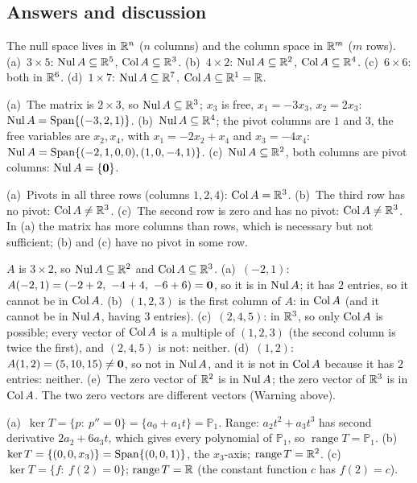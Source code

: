 \documentclass[11pt]{article}
\begin{document}
\subsection*{Answers and discussion}
\begin{description}[leftmargin=0pt,itemsep=5pt]
  \item[Knowledge Check \ref{kc:shapes}.] The null space lives in $\mathbb{R}^n$ ($n$ columns) and the column space in $\mathbb{R}^m$ ($m$ rows). (a)~$3\times5$: $\operatorname{Nul} A\subseteq\mathbb{R}^5$, $\operatorname{Col} A\subseteq\mathbb{R}^3$. (b)~$4\times2$: $\operatorname{Nul} A\subseteq\mathbb{R}^2$, $\operatorname{Col} A\subseteq\mathbb{R}^4$. (c)~$6\times6$: both in $\mathbb{R}^6$. (d)~$1\times7$: $\operatorname{Nul} A\subseteq\mathbb{R}^7$, $\operatorname{Col} A\subseteq\mathbb{R}^1=\mathbb{R}$.
  \item[Knowledge Check \ref{kc:readnul}.] (a)~The matrix is $2\times3$, so $\operatorname{Nul} A\subseteq\mathbb{R}^3$; $x_3$ is free, $x_1=-3x_3$, $x_2=2x_3$: $\operatorname{Nul} A=\operatorname{Span}\{(-3,2,1)\}$. (b)~$\operatorname{Nul} A\subseteq\mathbb{R}^4$; the pivot columns are $1$ and $3$, the free variables are $x_2,x_4$, with $x_1=-2x_2+x_4$ and $x_3=-4x_4$: $\operatorname{Nul} A=\operatorname{Span}\{(-2,1,0,0),(1,0,-4,1)\}$. (c)~$\operatorname{Nul} A\subseteq\mathbb{R}^2$, both columns are pivot columns: $\operatorname{Nul} A=\{\mathbf{0}\}$.
  \item[Knowledge Check \ref{kc:surj}.] (a)~Pivots in all three rows (columns $1,2,4$): $\operatorname{Col} A=\mathbb{R}^3$. (b)~The third row has no pivot: $\operatorname{Col} A\neq\mathbb{R}^3$. (c)~The second row is zero and has no pivot: $\operatorname{Col} A\neq\mathbb{R}^3$. In (a) the matrix has more columns than rows, which is necessary but not sufficient; (b) and (c) have no pivot in some row.
  \item[Knowledge Check \ref{kc:nulorcol}.] $A$ is $3\times2$, so $\operatorname{Nul} A\subseteq\mathbb{R}^2$ and $\operatorname{Col} A\subseteq\mathbb{R}^3$. (a)~$(-2,1)$: $A(-2,1)=(-2+2,\ -4+4,\ -6+6)=\mathbf{0}$, so it is in $\operatorname{Nul} A$; it has $2$ entries, so it cannot be in $\operatorname{Col} A$. (b)~$(1,2,3)$ is the first column of $A$: in $\operatorname{Col} A$ (and it cannot be in $\operatorname{Nul} A$, having $3$ entries). (c)~$(2,4,5)$: in $\mathbb{R}^3$, so only $\operatorname{Col} A$ is possible; every vector of $\operatorname{Col} A$ is a multiple of $(1,2,3)$ (the second column is twice the first), and $(2,4,5)$ is not: neither. (d)~$(1,2)$: $A(1,2)=(5,10,15)\neq\mathbf{0}$, so not in $\operatorname{Nul} A$, and it is not in $\operatorname{Col} A$ because it has $2$ entries: neither. (e)~The zero vector of $\mathbb{R}^2$ is in $\operatorname{Nul} A$; the zero vector of $\mathbb{R}^3$ is in $\operatorname{Col} A$. The two zero vectors are different vectors (Warning above).
  \item[Knowledge Check \ref{kc:kerrange}.] (a)~$\ker T=\{p:\ p''=0\}=\{a_0+a_1t\}=\mathbb{P}_1$. Range: $a_2t^2+a_3t^3$ has second derivative $2a_2+6a_3t$, which gives every polynomial of $\mathbb{P}_1$, so $\operatorname{range}T=\mathbb{P}_1$. (b)~$\ker T=\{(0,0,x_3)\}=\operatorname{Span}\{(0,0,1)\}$, the $x_3$-axis; $\operatorname{range}T=\mathbb{R}^2$. (c)~$\ker T=\{f:\ f(2)=0\}$; $\operatorname{range}T=\mathbb{R}$ (the constant function $c$ has $f(2)=c$).

\end{description}
\end{document}
